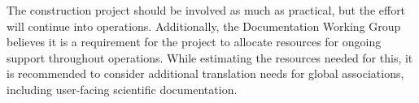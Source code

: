 The construction project should be involved as much as practical, but the effort will continue into operations.
Additionally, the Documentation Working Group believes it is a requirement for the project to allocate resources for ongoing support throughout operations.
While estimating the resources needed for this, it is recommended to consider additional translation needs for global associations, including user-facing scientific documentation.
